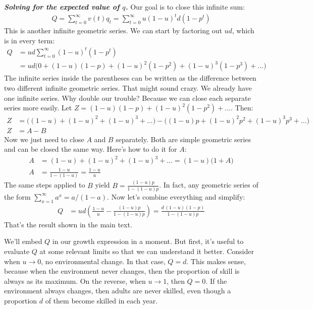 \documentclass[10pt,reqno]{amsbook}
\numberwithin{equation}{chapter}
\newenvironment{mathbox}[2]
{\begin{table}[#1]
\justify\begin{tcolorbox}[enhanced, oversize]\footnotesize\noindent\textbf{\emph{#2}}}
{\end{tcolorbox}\end{table}}
\begin{document}
\begin{mathbox}{ptb}{Solving for the expected value of $q$.}
Our goal is to close this infinite sum:
\begin{align*}
	Q = \sum_{t=0}^\infty v(t) q_t = \sum_{t=0}^\infty u(1-u)^t d(1-p^t)
\end{align*}
This is another infinite geometric series. We can start by factoring out $ud$, which is in every term:
\begin{align*}
	Q &= ud \sum_{t=0}^\infty (1-u)^{t} (1-p^t) \\
	&= ud \big( 0 + (1-u)(1-p) + (1-u)^2 (1-p^2) + (1-u)^3 (1-p^3) + ... \big)
\end{align*}
The infinite series inside the parentheses can be written as the difference between two different infinite geometric series. That might sound crazy. We already have one infinite series. Why double our trouble? Because we can close each separate series more easily. Let $Z = (1-u)(1-p) + (1-u)^2 (1-p^2) + ...$. Then:
\begin{align*}
	Z &= \big( (1-u) + (1-u)^2 + (1-u)^3 + ... \big) - \big( (1-u)p + (1-u)^2 p^2 + (1-u)^3 p^3 + ... \big)\\
	Z &= A - B
\end{align*}
Now we just need to close $A$ and $B$ separately. Both are simple geometric series and can be closed the same way. Here's how to do it for $A$:
\begin{align*}
	A &= (1-u) + (1-u)^2 + (1-u)^3 + ... = (1-u) \big( 1 + A ) \\
	A &= \frac{1-u}{1-(1-u)} = \frac{1-u}{u}
\end{align*}
The same steps applied to $B$ yield $B = \frac{(1-u)p}{1-(1-u)p}$. In fact, any geometric series of the form $\sum_{x=1}^\infty a^x = a/(1-a)$. Now let's combine everything and simplify:
\begin{align*}
	Q &= ud \left( \frac{1-u}{u} - \frac{(1-u)p}{1-(1-u)p} \right) 
	= \frac{ d \, (1-u) (1-p) }{ 1 - (1-u)p }
\end{align*}
That's the result shown in the main text.
\end{mathbox}


We'll embed $Q$ in our growth expression in a moment. But first, it's useful to evaluate $Q$ at some relevant limits so that we can understand it better. Consider when $u \rightarrow 0$, no environmental change. In that case, $Q = d$. This makes sense, because when the environment never changes, then the proportion of skill is always as its maximum. On the reverse, when $u \rightarrow 1$, then $Q = 0$. If the environment always changes, then adults are never skilled, even though a proportion $d$ of them become skilled in each year. 
\end{document}
